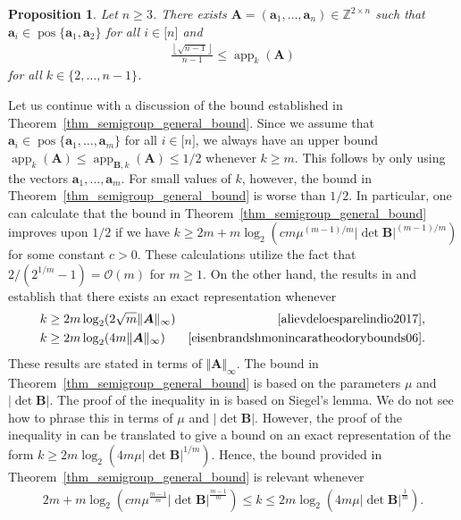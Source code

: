 \documentclass[pdflatex]{sn-jnl}
\DeclareMathOperator{\app}{app}
\DeclareMathOperator{\pos}{pos}
\newcommand{\Z}{\mathbb{Z}}
\newcommand{\bA}{\bm{A}}
\newcommand{\ba}{\bm{a}}
\newcommand{\bB}{\bm{B}}
\theoremstyle{thmstyleone}%
\newtheorem{proposition}{Proposition}
\theoremstyle{thmstyletwo}%
\theoremstyle{thmstylethree}%
\begin{document}
	\begin{proposition}
		\label{prop_semigroup_lower_bound_general}
		Let $n\geq 3$. There exists $\bA = (\ba_1,\ldots,\ba_n)\in\Z^{2\times n}$ such that  $\ba_i\in\pos\lbrace \ba_1,\ba_2\rbrace$ for all $i\in\lbrack n\rbrack$ and
		\begin{align*}
			\frac{\left\lfloor \sqrt{n - 1}\right\rfloor}{n-1}\leq \app_{k}(\bA)
		\end{align*}
		for all $k\in \lbrace 2,\ldots,n-1\rbrace$.
	\end{proposition}
	
	Let us continue with a discussion of the bound established in Theorem~\ref{thm_semigroup_general_bound}. Since we assume that $\ba_i\in\pos\lbrace \ba_1,\ldots,\ba_m\rbrace$ for all $i\in\lbrack n\rbrack$, we always have an upper bound $\app_k(\bA)\leq \app_{\bB,k}(\bA) \leq 1/2$ whenever $k\geq m$. This follows by only using the vectors $\ba_1,\ldots,\ba_m$. For small values of $k$, however, the bound in Theorem~\ref{thm_semigroup_general_bound} is worse than $1/2$. In particular, one can calculate that the bound in Theorem~\ref{thm_semigroup_general_bound} improves upon $1/2$ if we have $k\geq 2m+m\log_2(cm\mu^{(m-1)/m}\left|\det\bB\right|^{(m-1)/m})$ for some constant $c>0$. These calculations utilize the fact that ${2}/(2^{1/m} - 1) = \mathcal{O}(m)$ for $m\geq 1$. 
	On the other hand, the results in \cite{alievdeloesparelindio2017} and \cite{eisenbrandshmonincaratheodorybounds06} establish that there exists an exact representation whenever 
	\begin{align*}
		k & \geq 2m\log_2(2\sqrt{m}\Vert\bA\Vert_\infty) & \cite{alievdeloesparelindio2017},\\
		k & \geq 2m\log_2(4m\Vert\bA\Vert_\infty) & \cite{eisenbrandshmonincaratheodorybounds06}.
	\end{align*}
	These results are stated in terms of $\Vert \bA\Vert_\infty$. The bound in Theorem~\ref{thm_semigroup_general_bound} is based on the parameters $\mu$ and $\left| \det\bB \right|$. The proof of the inequality in \cite{alievdeloesparelindio2017} is based on Siegel's lemma. We do not see how to phrase this in terms of $\mu$ and $\left|\det\bB\right|$. However, the proof of the inequality in \cite{eisenbrandshmonincaratheodorybounds06} can be translated to give a bound on an exact representation of the form $k \geq 2m\log_2(4m\mu\left|\det\bB\right|^{1/m})$. Hence, the bound provided in Theorem~\ref{thm_semigroup_general_bound} is relevant whenever
	\begin{align*}
		2m+m\log_2(cm\mu^{\frac{m-1}{m}}\left|\det\bB\right|^{\frac{m-1}{m}})\leq k\leq 2m\log_2(4m\mu\left|\det\bB\right|^{\frac{1}{m}}).
	\end{align*}
\end{document}
